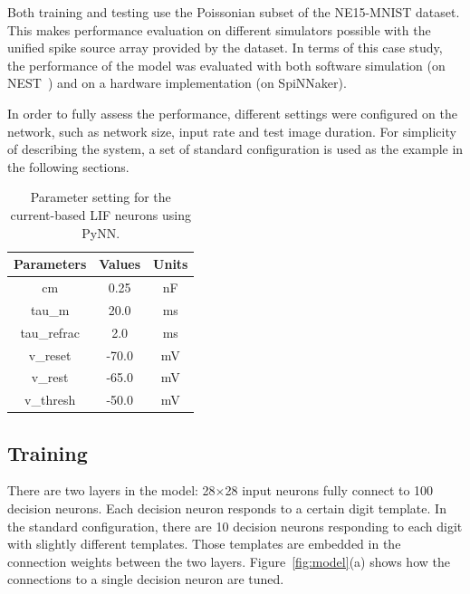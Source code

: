 Both training and testing use the Poissonian subset of the NE15-MNIST dataset.
This makes performance evaluation on different simulators possible with the unified spike source array provided by the dataset. 
In terms of this case study, the performance of the model was evaluated with both software simulation (on NEST~\citep{gewaltig2007nest}) and on a hardware implementation (on SpiNNaker).

In order to fully assess the performance, different settings were configured on the network, such as network size, input rate and test image duration.
For simplicity of describing the system, a set of standard configuration is used as the example in the following sections.

\begin{table}[hbbp]
	\centering
	\caption[LIF parameter setting using PyNN.]{Parameter setting for the current-based LIF neurons using PyNN.}
	\bgroup
	\def\arraystretch{1.4}
	\begin{tabular}{c c c}
		Parameters & Values & Units \\
		\hline
		cm & 0.25 & nF	\\
		tau\_m & 20.0 & ms\\
		tau\_refrac & 2.0 & ms\\
		v\_reset & -70.0 & mV\\
		v\_rest & -65.0 & mV\\
		v\_thresh & -50.0 & mV\\
	\end{tabular}
	\egroup
	\label{tbl:pynnSetting}
\end{table}

\subsection{Training}
There are two layers in the model: 28$\times$28 input neurons fully connect to 100 decision neurons.
Each decision neuron responds to a certain digit template.
In the standard configuration, there are 10 decision neurons responding to each digit with slightly different templates.
Those templates are embedded in the connection weights between the two layers.
Figure~\ref{fig:model}(a) shows how the connections to a single decision neuron are tuned.

